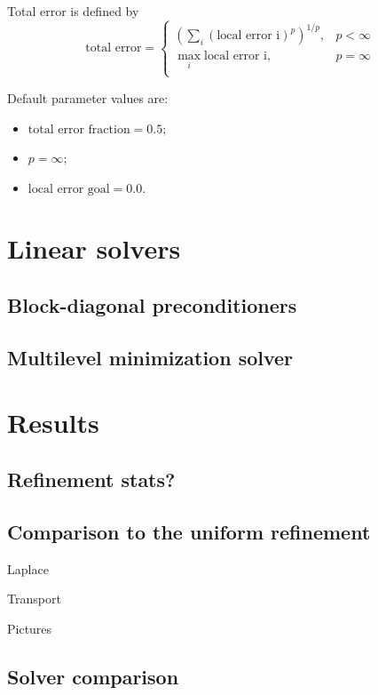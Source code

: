\documentclass[a4paper,12pt]{amsart}
\numberwithin{equation}{section}
\begin{document}
Total error is defined by
$$
\mbox{total error}  = 
\left\{ 
\begin{array}{lc}
\left( \sum_i \left(\mbox{local error i}\right)^p \right)^{1/p}, & p < \infty \\
\max_i \mbox{local error i}, & p = \infty \\
\end{array}
\right.
$$

Default parameter values are:
\begin{itemize}
	\item $\mbox{total error fraction} = 0.5$;
	\item $p = \infty$;
	\item $\mbox{local error goal} = 0.0$.
\end{itemize}

\section{Linear solvers}

\subsection{Block-diagonal preconditioners}

\subsection{Multilevel minimization solver}

\section{Results}

\subsection{Refinement stats?}

\subsection{Comparison to the uniform refinement}

Laplace

Transport

Pictures

\subsection{Solver comparison}
\end{document}
